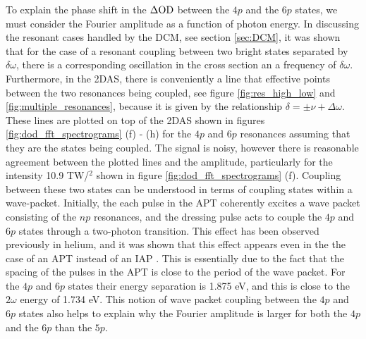 To explain the phase shift in the $\Delta\mathrm{OD}$ between the $4p$ and the $6p$ states, we must consider the Fourier amplitude as a function of photon energy.  In discussing the resonant cases handled by the DCM, see section \ref{sec:DCM}, it was shown that for the case of a resonant coupling between two bright states separated by $\delta\omega$, there is a corresponding oscillation in the cross section an a frequency of $\delta\omega$.  Furthermore, in the 2DAS, there is conveniently a line that effective points between the two resonances being coupled, see figure \ref{fig:res_high_low} and \ref{fig:multiple_resonances}, because it is given by the relationship $\delta = \pm\nu + \Delta\omega$.  These lines are plotted on top of the 2DAS shown in figures \ref{fig:dod_fft_spectrograms} (f) - (h) for the $4p$ and $6p$ resonances assuming that they are the states being coupled.  The signal is noisy, however there is reasonable agreement between the plotted lines and the amplitude, particularly for the intensity 10.9 TW/$^2$ shown in figure \ref{fig:dod_fft_spectrograms} (f).  Coupling between these two states can be understood in terms of coupling states within a wave-packet.  Initially, the each pulse in the APT coherently excites a wave packet consisting of the $np$ resonances, and the dressing pulse acts to couple the $4p$ and $6p$ states through a two-photon transition.  This effect has been observed previously in helium, and it was shown that this effect appears even in the the case of an APT instead of an IAP \cite{ottReconstructionControlTimedependent2014, ottAttosecondMultidimensionalInterferometry2012}.  This is essentially due to the fact that the spacing of the pulses in the APT is close to the period of the wave packet.  For the $4p$ and $6p$ states their energy separation is  1.875 eV, and this is close to the $2\omega$ energy of 1.734 eV. This notion of wave packet coupling between the $4p$ and $6p$ states also helps to explain why the Fourier amplitude is larger for both the $4p$ and the $6p$ than the $5p$.  

